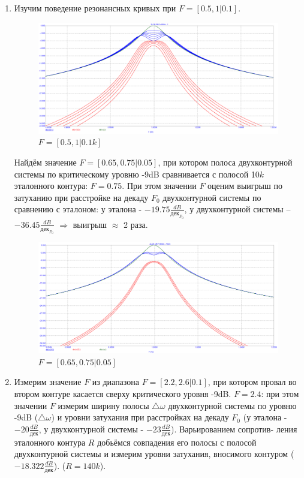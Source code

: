 \documentclass[a4paper, 12pt]{article}%
\begin{document}
\begin{enumerate}
\item Изучим поведение резонансных кривых при $F = [0.5, 1 | 0.1]$. 

\begin{figure}[h!]
\centering
\includegraphics[scale = 0.4]{images/plot6_1.png}
\caption{$F = [0.5, 1 | 0.1k]$}
\label{fig:Image1}
\end{figure}

Найдём значение $F = [0.65, 0.75 | 0.05]$, при котором полоса двухконтурной системы по критическому уровню -9dB сравнивается с полосой 10$k$ эталонного контура: $F = 0.75$. При этом значении $F$ оценим выигрыш по затуханию при расстройке на декаду $F_0$ двухконтурной системы по сравнению с эталоном: у эталона - $-19.75 \frac{dB}{\text{дек}_{F_0}}$, у двухконтурной системы – $-36.45 \frac{dB}{\text{дек}_{F_0}}$ $\Longrightarrow$ выигрыш $\approx$ 2 раза.

\begin{figure}[h!]
\centering
\includegraphics[scale = 0.4]{images/plot6_2.png}
\caption{$F = [0.65, 0.75 | 0.05]$}
\label{fig:Image1}
\end{figure}

\item Измерим значение $F$ из диапазона $F = [2.2, 2.6 | 0.1]$, при котором провал во втором контуре касается сверху критического уровня -9dB. 
$F = 2.4$: при этом значении $F$ измерим ширину полосы $\bigtriangleup\omega$ двухконтурной системы по уровню -9dB ($\bigtriangleup \omega$) и уровни затухания при расстройках на декаду $F_0$ (у эталона - $-20 \frac{dB}{\text{дек}}$, у двухконтурной системы - $-23 \frac{dB}{\text{дек}}$). Варьированием сопротив-
ления эталонного контура $R$ добьёмся совпадения его полосы с полосой двухконтурной системы и измерим уровни затухания, вносимого контуром ($-18.322 \frac{dB}{\text{дек}}$). ($R = 140k$).


\end{enumerate}
\end{document}
